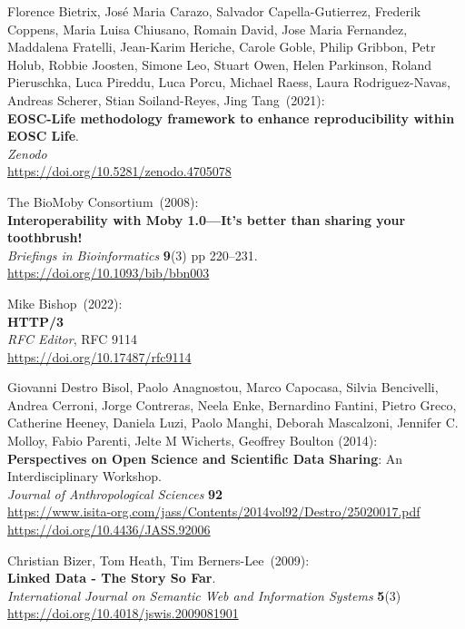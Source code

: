 \begin{thebibliography}{9}
Florence Bietrix, José Maria Carazo, Salvador Capella-Gutierrez, Frederik Coppens, Maria Luisa Chiusano, Romain David, Jose Maria Fernandez, Maddalena Fratelli, Jean-Karim Heriche, Carole Goble, Philip Gribbon, Petr Holub, Robbie Joosten, Simone Leo, Stuart Owen, Helen Parkinson, Roland Pieruschka, Luca Pireddu, Luca Porcu, Michael Raess, Laura Rodriguez-Navas, Andreas Scherer, Stian Soiland-Reyes, Jing Tang~(2021): \\
\textbf{EOSC-Life methodology framework to enhance reproducibility within EOSC Life}.\\
\emph{Zenodo}\\
\url{https://doi.org/10.5281/zenodo.4705078}

The BioMoby Consortium~(2008): \\
\textbf{Interoperability with Moby 1.0---It's better than sharing your toothbrush!}\\
\emph{Briefings in Bioinformatics} \textbf{9}(3) pp
220--231.\\
\url{https://doi.org/10.1093/bib/bbn003}

Mike Bishop~(2022): \\
\textbf{{HTTP}/3}\\
\emph{RFC Editor}, RFC 9114 \\
\url{https://doi.org/10.17487/rfc9114}

Giovanni Destro Bisol, Paolo Anagnostou, Marco Capocasa, Silvia Bencivelli, 
Andrea Cerroni, Jorge Contreras, Neela Enke, Bernardino Fantini, Pietro Greco, Catherine Heeney, Daniela Luzi, Paolo Manghi, Deborah Mascalzoni, Jennifer C. Molloy, Fabio Parenti, Jelte M Wicherts, Geoffrey Boulton (2014):\\
\textbf{Perspectives on Open Science and Scientific Data Sharing}: An Interdisciplinary Workshop. \\
\emph{Journal of Anthropological Sciences} \textbf{92} \\
\url{https://www.isita-org.com/jass/Contents/2014vol92/Destro/25020017.pdf} \\
\url{https://doi.org/10.4436/JASS.92006}


Christian Bizer, Tom Heath, Tim Berners-Lee~(2009): \\
\textbf{Linked Data - The Story So Far}.\\
\emph{International Journal on Semantic Web and Information Systems}
\textbf{5}(3)\\
\url{https://doi.org/10.4018/jswis.2009081901}


\end{thebibliography}

